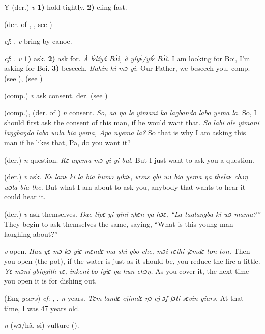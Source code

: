 \begin{letter}{Y}
 (der.) \textit{v} \textbf{1)} hold tightly. \textbf{2)} cling fast.

 (der. of , , see ) 

 \textit{cf}: . \textit{v} bring by canoe.

 \textit{cf}: . \textit{v} \textbf{1)} ask. \textbf{2)} ask for. \textit{À lɛ́líyá Bɔ̀ì, à yíyɛ́/yíɛ́ Bɔ̀ì.} I am looking for Boi, I'm asking for Boi. \textbf{3)} beseech. \textit{Bahin hi mɔ yi.} Our Father, we beseech you. comp.  (see ),  (see ) 

 (comp.) \textit{v} ask consent. der.  (see ) 

 (comp.), (der. of ) \textit{n} consent. \textit{So, aa ŋa le yimani ko lagbando labo yema la.} So, I should first ask the consent of this man, if he would want that. \textit{So labi ale yimani laŋgbaŋdo labo wɔla bia yema, Apa nyema la?} So that is why I am asking this man if he likes that, Pa, do you want it?

 (der.) \textit{n} question. \textit{Kɛ ayema mɔ yi yi bul.} But I just want to ask you a question.

 (der.) \textit{v} ask. \textit{Kɛ lanɛ ki la bia humɔ yikiɛ, wɔnɛ gbi wɔ bia yema ŋa thelaɛ chɔŋ wɔla bia the.} But what I am about to ask you, anybody that wants to hear it could hear it.

 (der.) \textit{v} ask themselves. \textit{Ŋae tipɛ yi-yini-ŋkɛn ŋa hɔɛ, “La taalaŋgba ki wɔ mama?”} They begin to ask themselves the same, saying, “What is this young man laughing about?”

 \textit{v} open. \textit{Haa yɛ mɔ kɔ yiɛ mɛndɛ ma shi gbo che, mɔi rɛthi jɛmdɛ ton-ton.} Then you open (the pot), if the water is just as it should be, you reduce the fire a little. \textit{Yɛ mɔni gbiŋgith vɛ, inkeni bo iyiɛ ŋa hun chɔŋ.} As you cover it, the next time you open it is for dishing out.

 (Eng \textit{years}) \textit{cf}: , . \textit{n} years. \textit{Tɛm landɛ ejimdɛ ŋɔ ej ɔf fɔti sɛvin yiars.} At that time, I was 47 years old.

 \textit{n} (wɔ/hã, si) vulture (\citealt{Pichl1967}).


\end{letter}
